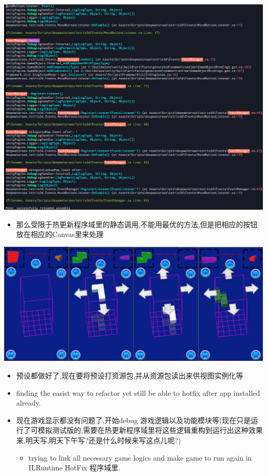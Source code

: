 \documentclass[9pt, b5paper]{article}
\begin{document}
\includegraphics[width=.9\linewidth]{./pic/readme_20221029_185957.png}
\begin{itemize}
\item 那么受限于热更新程序域里的静态调用,不能用最优的方法,但是把相应的按钮放在相应的Canvas里来处理
\end{itemize}

\includegraphics[width=.9\linewidth]{./pic/readme_20221029_110512.png}
\begin{itemize}
\item 预设都做好了,现在要将预设打资源包,并从资源包读出来供视图实例化等
\item finding the easist way to refactor yet still be able to hotfix after app installed already.
\item 现在游戏显示都没有问题了,开始debug 游戏逻辑以及功能模块等(现在只是运行了可模拟测试版的,需要在热更新程序域里将这些逻辑重构到运行出这种效果来,明天写,明天下午写?还是什么时候来写这点儿呢?)
\begin{itemize}
\item trying to link all necessary game logics and make game to run again in ILRuntime HotFix 程序域里.
\end{itemize}
\end{itemize}
\end{document}
